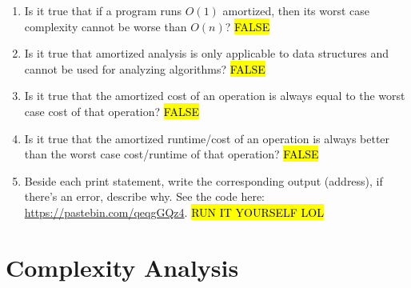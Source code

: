 \documentclass{article}
\begin{document}
\begin{enumerate}
    \item Is it true that if a program runs \( O(1) \) amortized, then its worst case complexity cannot be worse than \( O(n) \)? \hl{FALSE}
    
    \item Is it true that amortized analysis is only applicable to data structures and cannot be used for analyzing algorithms? \hl{FALSE}
    
    \item Is it true that the amortized cost of an operation is always equal to the worst case cost of that operation? \hl{FALSE}
    
    \item Is it true that the amortized runtime/cost of an operation is always better than the worst case cost/runtime of that operation? \hl{FALSE}
    
    \item Beside each print statement, write the corresponding output (address), if there’s an error, describe why. See the code here: \url{https://pastebin.com/qeqgGQz4}. \hl{RUN IT YOURSELF LOL}
    \vspace{10pt}

    
\end{enumerate}

\newpage
\section*{Complexity Analysis}
\end{document}
